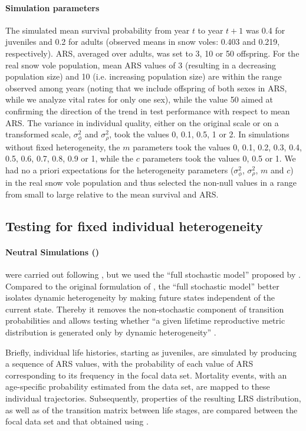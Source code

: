 \paragraph{Simulation parameters}
The simulated mean survival probability from  year $t$ to year $t+1$ was 0.4 for juveniles and 0.2 for adults (observed means in snow voles: 0.403 and 0.219, respectively). ARS, averaged over adults, was set to 3, 10 or 50 offspring. For the real snow vole population, mean ARS values of 3 (resulting in a decreasing population size) and 10 (i.e. increasing population size) are within the range observed among years (noting that we include offspring of both sexes in ARS, while we analyze vital rates for only one sex), while the value 50 aimed at confirming the direction of the trend in test performance with respect to mean ARS. The variance in individual quality, either on the original scale or on a transformed scale, $\sigma_{\phi}^2$ and $\sigma_{\rho}^2$, took the values 0, 0.1, 0.5, 1 or 2. In simulations without fixed heterogeneity, the $m$ parameters took the values 0, 0.1, 0.2, 0.3, 0.4, 0.5, 0.6, 0.7, 0.8, 0.9 or 1, while the $c$ parameters took the values 0, 0.5 or 1. We had no a priori expectations for the heterogeneity parameters ($\sigma_{\phi}^2$, $\sigma_{\rho}^2$, $m$ and $c$) in the real snow vole population and thus selected the non-null values in a range from small to large relative to the mean survival and ARS.


\subsection{Testing for fixed individual heterogeneity}
\paragraph{Neutral Simulations (\NSM)}
\NSM were carried out following \cite{Tuljapurkar2009}, but we used the ``full stochastic model'' proposed by \cite{Plard2012}. Compared to the original formulation of \NSM, the ``full stochastic model'' better isolates dynamic heterogeneity by making future states independent of the current state. Thereby it removes the non-stochastic component of transition probabilities and allows testing whether ``a given lifetime reproductive metric distribution is generated only by dynamic heterogeneity'' \parencite{Plard2012}. 

Briefly, individual life histories, starting as juveniles, are simulated by producing a sequence of ARS values, with the probability of each value of ARS corresponding to its frequency in the focal data set. Mortality events, with an age-specific probability estimated from the data set, are mapped to these individual trajectories. Subsequently, properties of the resulting LRS distribution, as well as of the transition matrix between life stages, are compared between the focal data set and that obtained using \NSM.

